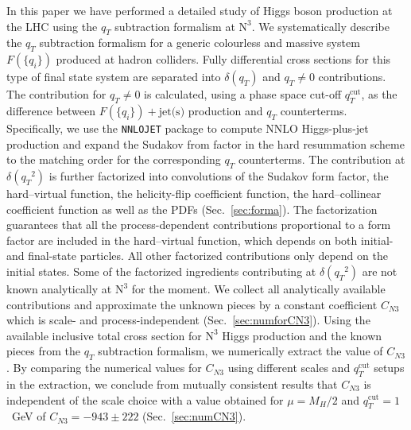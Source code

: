 \documentclass[12pt]{article}
\DeclareRobustCommand{\qt}{\ensuremath{q_T}\xspace}
\DeclareRobustCommand{\qtcut}{\ensuremath{q_T^\mathrm{cut}}\xspace}
\DeclareRobustCommand{\jets}{\text{jet(s)}\xspace}
\DeclareRobustCommand{\LO}{\text{LO}\xspace}
\DeclareRobustCommand{\N}[1]{\ensuremath{\text{N}^{#1}}} %
\begin{document}
In this paper we have performed a detailed study of Higgs boson production at the LHC using the $\qt$ subtraction formalism at \N3\LO. We systematically describe the $\qt$ subtraction formalism for a generic colourless and massive system $F(\{q_i\})$ produced at hadron colliders. Fully differential cross sections for this type of final state system are separated into $\delta(\qt)$ and $\qt\ne 0$ contributions. The contribution for $\qt\ne 0$ is calculated, 
using a phase space cut-off $\qtcut$, as the difference between $F(\{q_i\})+\jets$ production and $\qt$ counterterms. Specifically, we use the \texttt{NNLOJET} package to compute NNLO Higgs-plus-jet production and expand the Sudakov from factor in the hard resummation scheme to the matching order for the corresponding $\qt$ counterterms. The contribution at $\delta(\qt^{2})$ is further factorized into convolutions of the Sudakov form factor, the hard--virtual function, the helicity-flip coefficient function, the hard--collinear coefficient function as well as the PDFs (Sec.~\ref{sec:forma}). The factorization guarantees that all the process-dependent contributions proportional to a form factor are included in the hard--virtual function, which depends on both initial- and final-state particles. All other factorized contributions only depend on the initial states. Some of the factorized ingredients contributing at $\delta(\qt^{2})$ are not known analytically at \N3\LO for the moment. We collect all analytically available contributions and approximate the unknown pieces by a constant coefficient $C_{N3}$ which is scale- and process-independent (Sec.~\ref{sec:numforCN3}). Using the available inclusive total cross section for \N3\LO Higgs production and the known pieces from  the $\qt$ subtraction formalism, we numerically extract the value of $C_{N3}$. By comparing the numerical values for $C_{N3}$ using different scales and $\qtcut$ setups in the extraction, we conclude from mutually consistent results that $C_{N3}$ is independent of the scale choice with a value obtained for $\mu=M_H/2$ and $\qtcut = 1$~GeV of $C_{N3}=-943\pm 222$ (Sec.~\ref{sec:numCN3}).
\end{document}
